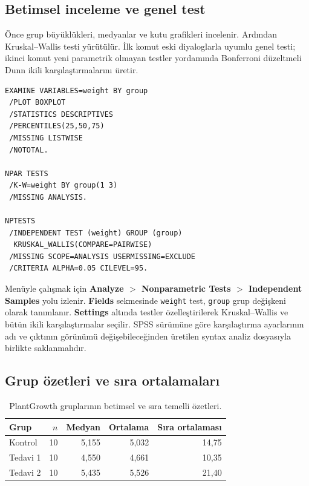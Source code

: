 \subsection{Betimsel inceleme ve genel test}

Önce grup büyüklükleri, medyanlar ve kutu grafikleri incelenir. Ardından
Kruskal--Wallis testi yürütülür. İlk komut eski diyaloglarla uyumlu genel
testi; ikinci komut yeni parametrik olmayan testler yordamında Bonferroni
düzeltmeli Dunn ikili karşılaştırmalarını üretir.

\begin{lstlisting}[language={}]
EXAMINE VARIABLES=weight BY group
 /PLOT BOXPLOT
 /STATISTICS DESCRIPTIVES
 /PERCENTILES(25,50,75)
 /MISSING LISTWISE
 /NOTOTAL.

NPAR TESTS
 /K-W=weight BY group(1 3)
 /MISSING ANALYSIS.

NPTESTS
 /INDEPENDENT TEST (weight) GROUP (group)
  KRUSKAL_WALLIS(COMPARE=PAIRWISE)
 /MISSING SCOPE=ANALYSIS USERMISSING=EXCLUDE
 /CRITERIA ALPHA=0.05 CILEVEL=95.
\end{lstlisting}

Menüyle çalışmak için \textbf{Analyze $>$ Nonparametric Tests $>$ Independent
Samples} yolu izlenir. \textbf{Fields} sekmesinde \texttt{weight} test,
\texttt{group} grup değişkeni olarak tanımlanır. \textbf{Settings} altında
testler özelleştirilerek Kruskal--Wallis ve bütün ikili karşılaştırmalar
seçilir. SPSS sürümüne göre karşılaştırma ayarlarının adı ve çıktının görünümü
değişebileceğinden üretilen syntax analiz dosyasıyla birlikte saklanmalıdır.

\subsection{Grup özetleri ve sıra ortalamaları}

\begin{table}[htbp]
\centering
\caption{PlantGrowth gruplarının betimsel ve sıra temelli özetleri.}
\begin{tabular}{@{}lrrrr@{}}
\toprule
Grup & $n$ & Medyan & Ortalama & Sıra ortalaması \\
\midrule
Kontrol & 10 & 5,155 & 5,032 & 14,75 \\
Tedavi 1 & 10 & 4,550 & 4,661 & 10,35 \\
Tedavi 2 & 10 & 5,435 & 5,526 & 21,40 \\
\bottomrule
\end{tabular}
\end{table}

